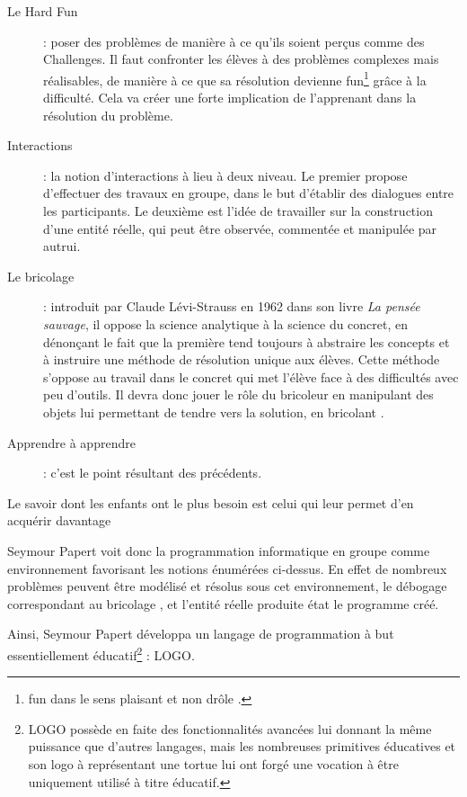 \begin{description}
  \item[Le \og Hard Fun \fg{}] : poser des problèmes de manière à ce qu'ils soient perçus comme des Challenges. Il faut confronter les élèves à des problèmes complexes mais réalisables, de manière à ce que sa résolution devienne \og fun\footnote{\og fun \fg{} dans le sens \og plaisant \fg{} et non \og drôle \fg{}.}\fg{} grâce à la difficulté. Cela va créer une forte implication de l'apprenant dans la résolution du problème.
  \item[Interactions] : la notion d'interactions à lieu à deux niveau. Le premier propose d'effectuer des travaux en groupe, dans le but d'établir des dialogues entre les participants. Le deuxième est l'idée de travailler sur la construction d'une entité réelle, qui peut être observée, commentée et manipulée par autrui.
  \item[Le \og bricolage \fg{}] : introduit par Claude Lévi-Strauss en 1962 dans son livre \emph{La pensée sauvage}, il oppose la science analytique à la science du concret, en dénonçant le fait que la première tend toujours à abstraire les concepts et à instruire une méthode de résolution unique aux élèves. Cette méthode s'oppose au travail dans le concret qui met l'élève face à des difficultés avec peu d'outils. Il devra donc jouer le rôle du \og bricoleur \fg{} en manipulant des objets lui permettant de tendre vers la solution, en \og bricolant \fg{}.
  \item[\og Apprendre à apprendre \fg{} ] : c'est le point résultant des précédents.
\end{description}

\begin{coolquote}
    Le savoir dont les enfants ont le plus besoin est celui qui leur permet d'en acquérir davantage
\end{coolquote}

Seymour Papert voit donc la programmation informatique en groupe comme environnement favorisant les notions énumérées ci-dessus. En effet de nombreux problèmes peuvent être modélisé et résolus sous cet environnement, le débogage correspondant au \og bricolage \fg{}, et l'entité réelle produite état le programme créé.

Ainsi, Seymour Papert développa un langage de programmation à but essentiellement éducatif\footnote{LOGO possède en faite des fonctionnalités avancées lui donnant la même puissance que d'autres langages, mais les nombreuses primitives éducatives et son logo à représentant une tortue lui ont forgé une vocation à être uniquement utilisé à titre éducatif.} : LOGO.

